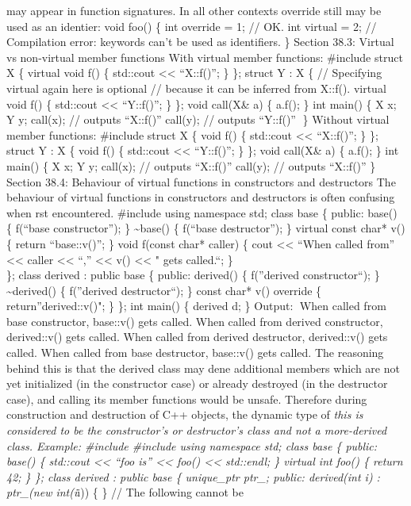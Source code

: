 may appear in function signatures. In all other contexts override still
may be used as an identier: void foo() \{ int override = 1; // OK. int
virtual = 2; // Compilation error: keywords can't be used as
identifiers. \} Section 38.3: Virtual vs non-virtual member functions
With virtual member functions: \#include struct X \{ virtual void f() \{
std::cout \textless\textless{} ``X::f()\n''; \} \}; struct Y : X \{ //
Specifying virtual again here is optional // because it can be inferred
from X::f(). virtual void f() \{ std::cout \textless\textless{}
``Y::f()\n''; \} \}; void call(X\& a) \{ a.f(); \} int main() \{ X x; Y
y; call(x); // outputs ``X::f()'' call(y); // outputs ``Y::f()'' \}
Without virtual member functions: \#include struct X \{ void f() \{
std::cout \textless\textless{} ``X::f()\n''; \} \}; struct Y : X \{ void
f() \{ std::cout \textless\textless{} ``Y::f()\n''; \} \}; void call(X\&
a) \{ a.f(); \} int main() \{ X x; Y y; call(x); // outputs ``X::f()''
call(y); // outputs ``X::f()'' \} Section 38.4: Behaviour of virtual
functions in constructors and destructors The behaviour of virtual
functions in constructors and destructors is often confusing when rst
encountered. \#include using namespace std; class base \{ public: base()
\{ f(``base constructor''); \} \textasciitilde base() \{ f(``base
destructor''); \} virtual const char* v() \{ return ``base::v()''; \}
void f(const char* caller) \{ cout \textless\textless{} ``When called
from'' \textless\textless{} caller \textless\textless{} ``,''
\textless\textless{} v() \textless\textless{} " gets called.\n``; \}\\
\}; class derived : public base \{ public: derived() \{ f(''derived
constructor``); \} \textasciitilde derived() \{ f(''derived
destructor``); \} const char* v() override \{ return''derived::v()"; \}
\}; int main() \{ derived d; \} Output: When called from base
constructor, base::v() gets called. When called from derived
constructor, derived::v() gets called. When called from derived
destructor, derived::v() gets called. When called from base destructor,
base::v() gets called. The reasoning behind this is that the derived
class may dene additional members which are not yet initialized (in the
constructor case) or already destroyed (in the destructor case), and
calling its member functions would be unsafe. Therefore during
construction and destruction of C++ objects, the dynamic type of
\emph{this is considered to be the constructor's or destructor's class
and not a more-derived class. Example: \#include \#include using
namespace std; class base \{ public: base() \{ std::cout
\textless\textless{} ``foo is'' \textless\textless{} foo()
\textless\textless{} std::endl; \} virtual int foo() \{ return 42; \}
\}; class derived : public base \{ unique\_ptr ptr\_; public:
derived(int i) : ptr\_(new int(i}i)) \{ \} // The following cannot be
